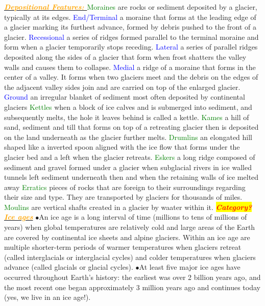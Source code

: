 \documentclass{article}
\newcommand{\ddd}{$\bullet$}
\newcommand{\red}[1]{\textcolor{red}{#1}}
\newcommand{\green}[1]{\textcolor{green}{#1}}
\newcommand{\blue}[1]{\textcolor{blue}{#1}}
\newcommand{\orange}[1]{\textcolor{orange}{#1}}
\newcommand{\mysection}[1]{\colorbox{yellow}{\textbf{\textit{\red{#1}}}}}
\newcommand{\mysub}[1]{\underline{\textbf{{\textit{\orange{#1}}}}}}
\newcommand{\mysubsub}[1]{{{\green{#1}}}}
\newcommand{\mysubsubsub}[1]{{{\blue{#1}}}}
\begin{document}
\begin{multicols*}{4}
	 	    \mysub{Depositional Features: }
			\mysubsub{Moraines} are rocks or sediment deposited by a glacier, typically at its edges.
			\mysubsubsub{End/Terminal} a moraine that forms at the leading edge of a glacier marking its furthest advance, formed by debris pushed to the front of a glacier.
			\mysubsubsub{Recessional} a series of ridges formed parallel to the terminal moraine and form when a glacier temporarily stops receding.
			\mysubsubsub{Lateral} a series of parallel ridges deposited along the sides of a glacier that form when frost shatters the valley walls and causes them to collapse.
			\mysubsubsub{Medial}  a ridge of a moraine that forms in the center of a valley. It forms when two glaciers meet and the debris on the edges of the adjacent valley sides join and are carried on top of the enlarged glacier.
			\mysubsubsub{Ground} an irregular blanket of sediment most often deposited by continental glaciers
			\mysubsub{Kettles} when a block of ice calves and is submerged into sediment, and subsequently melts, the hole it leaves behind is called a kettle.
			\mysubsub{Kames} a hill of sand, sediment and till that forms on top of a retreating glacier then is deposited on the land underneath as the glacier further melts.
			\mysubsub{Drumlins} an elongated hill shaped like a inverted spoon aligned with the ice flow that forms under the glacier bed and a left when the glacier retreats.
			\mysubsub{Eskers} a long ridge composed of sediment and gravel formed under a glacier when subglacial rivers in ice walled tunnels left sediment underneath then and when the retaining walls of ice melted away
			\mysubsub{Erratics} pieces of rocks that are foreign to their surroundings regarding their size and type. They are transported by glaciers for thousands of miles.
			\mysubsub{Moulins} are vertical shafts created in a glacier by waater within it.
        \mysection{Category?}
            \mysub{Ice ages}
                \ddd An ice age is a long interval of time (millions to tens of millions of years) when global temperatures are relatively cold and large areas of the Earth are covered by continental ice sheets and alpine glaciers. Within an ice age are multiple shorter-term periods of warmer temperatures when glaciers retreat (called interglacials or interglacial cycles) and colder temperatures when glaciers advance (called glacials or glacial cycles).
                \ddd At least five major ice ages have occurred throughout Earth’s history: the earliest was over 2 billion years ago, and the most recent one began approximately 3 million years ago and continues today (yes, we live in an ice age!).

\end{multicols*}
\end{document}
